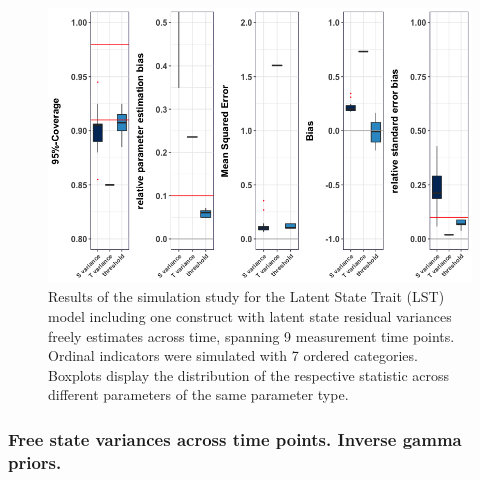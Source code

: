  \begin{figure}[H]
 \begin{adjustwidth}{-1cm}{-1cm}
    \begin{center}
  \includegraphics[width=1\textwidth]{Boxplot_LST_free.png}
   \end{center}
    \end{adjustwidth}
      \captionsetup{skip=10pt,width=1.05\textwidth}
\caption[Results LST free variance]{Results of the simulation study for the Latent State Trait (LST) model including one construct with latent state residual variances freely estimates across time, spanning 9 measurement time points.  Ordinal indicators were simulated with 7 ordered categories. Boxplots display the distribution of the respective statistic across different parameters of the same parameter type.}
\label{Fig: LST one free}
\end{figure}

  \subsubsection{Free state variances across time points. Inverse gamma priors.}

